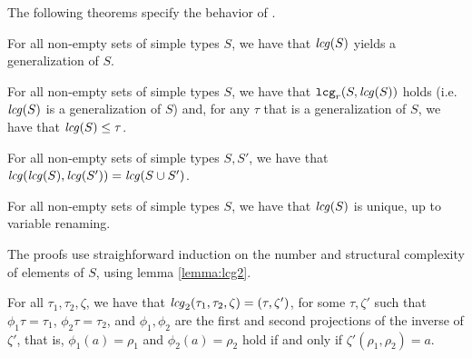 The following theorems specify the behavior of \lcg.

\begin{Theorem}
For all non-empty sets of simple types $S$, we have that ${\it lcg\/}(S)$
yields a generalization of $S$.
\label{theorem:lcg-is-sound}
\end{Theorem}

\begin{Theorem}
For all non-empty sets of simple types $S$, we have that
${\tt lcg}_r(S,{\it lcg\/}(S))$ holds (i.e.~${\it lcg\/}(S)$ is a generalization of $S$)
and, for any $\tau$ that is a generalization of $S$, we have that
${\it lcg\/}(S) \leq \tau$.
\label{theorem:lcg-is-complete}
\end{Theorem}

\begin{Theorem}
For all non-empty sets of simple types $S, S'$, we have that
${\it lcg\/}({\it lcg\/}(S),{\it lcg\/}(S')) = {\it lcg\/}(S \cup S')$.
\label{theorem:lcg-is-compositional}
\end{Theorem}

\begin{Theorem}
For all non-empty sets of simple types $S$, we have that ${\it lcg\/}(S)$ is
unique, up to variable renaming.
\label{theorem:lcg-is-unique-modulo-variable-renaming}
\end{Theorem}

The proofs use straighforward induction on the number and structural
complexity of elements of $S$, using lemma \ref{lemma:lcg2}.

\begin{Lemma}
  \label{lemma:lcg2}
  For all $\tau_1, \tau_2, \zeta$, we have that
  ${\it lcg\/}_2(\tau_1,\tau_2,\zeta)=(\tau, \zeta')$, for some $\tau,\zeta'$
  such that $\phi_1\tau = \tau_1$, $\phi_2\tau = \tau_2$, and
  $\phi_1,\phi_2$ are the first and second projections of the inverse
  of $\zeta'$, that is, $\phi_1(a) = \rho_1$ and $\phi_2(a) = \rho_2$
  hold if and only if $\zeta'(\rho_1, \rho_2) = a$.
  
\end{Lemma}


